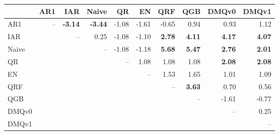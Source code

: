 \begin{tabular}{lrrrrrrrrr}
\toprule
 & AR1 & IAR & Naive & QR & EN & QRF & QGB & DMQv0 & DMQv1 \\
\midrule
AR1 & -- & \textbf{-3.14} & \textbf{-3.44} & -1.08 & -1.61 & -0.65 & 0.94 & 0.93 & 1.12 \\
IAR &  & -- & 0.25 & -1.08 & -1.10 & \textbf{2.78} & \textbf{4.11} & \textbf{4.17} & \textbf{4.07} \\
Naive &  &  & -- & -1.08 & -1.18 & \textbf{5.68} & \textbf{5.47} & \textbf{2.76} & \textbf{2.01} \\
QR &  &  &  & -- & 1.08 & 1.08 & 1.08 & \textbf{2.08} & \textbf{2.08} \\
EN &  &  &  &  & -- & 1.53 & 1.65 & 1.01 & 1.09 \\
QRF &  &  &  &  &  & -- & \textbf{3.63} & 0.70 & 0.56 \\
QGB &  &  &  &  &  &  & -- & -1.61 & -0.77 \\
DMQv0 &  &  &  &  &  &  &  & -- & 0.25 \\
DMQv1 &  &  &  &  &  &  &  &  & -- \\
\bottomrule
\end{tabular}
